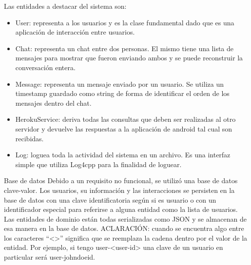 \documentclass[a4paper,10pt,spanish]{sphinxmanual}
\begin{document}
Las entidades a destacar del sistema son:
\begin{itemize}
\item {} 
User: representa a los usuarios y es la clase fundamental dado que es una aplicación de interacción entre usuarios.

\item {} 
Chat: representa un chat entre dos personas. El mismo tiene una lista de mensajes para mostrar que fueron enviando ambos y se puede reconstruir la conversación entera.

\item {} 
Message: representa un mensaje enviado por un usuario. Se utiliza un timestamp guardado como string de forma de identificar el orden de los mensajes dentro del chat.

\item {} 
HerokuService: deriva todas las consultas que deben ser realizadas al otro servidor y devuelve las respuestas a la aplicación de android tal cual son recibidas.

\item {} 
Log: loguea toda la actividad del sistema en un archivo. Es una interfaz simple que utiliza Log4cpp para la finalidad de loguear.

\end{itemize}

Base de datos
Debido a un requisito no funcional, se utilizó una base de datos clave-valor.
Los usuarios, su información y las interacciones se persisten en la base de datos con una clave identificatoria según si es usuario o con un identificador especial para referirse a alguna entidad como la lista de usuarios. Las entidades de dominio están todas serializadas como JSON y se almacenan de esa manera en la base de datos.
ACLARACIÓN: cuando se encuentra algo entre los caracteres “\textless{}\textgreater{}” significa que se reemplaza la cadena dentro por el valor de la entidad. Por ejemplo, si tengo user-\textless{}user-id\textgreater{} una clave de un usuario en particular será user-johndoeid.
\end{document}
